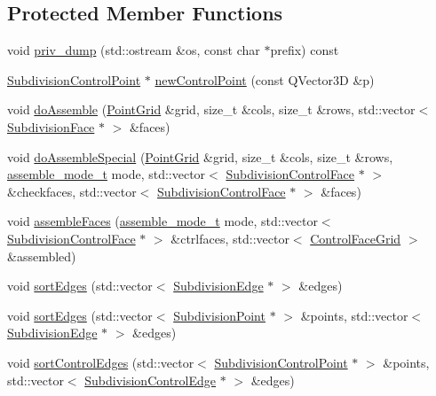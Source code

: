 \subsection*{Protected Member Functions}
\begin{DoxyCompactItemize}
\item 
void \hyperlink{classShipCAD_1_1SubdivisionSurface_a5c88eb988cc6a439242264bc54a6e3e1}{priv\+\_\+dump} (std\+::ostream \&os, const char $\ast$prefix) const 
\item 
\hyperlink{classShipCAD_1_1SubdivisionControlPoint}{Subdivision\+Control\+Point} $\ast$ \hyperlink{classShipCAD_1_1SubdivisionSurface_a251b711125d50aa51875451976e8a8d7}{new\+Control\+Point} (const Q\+Vector3D \&p)
\item 
void \hyperlink{classShipCAD_1_1SubdivisionSurface_a2e75286942677dde7ada4555a6842a43}{do\+Assemble} (\hyperlink{structShipCAD_1_1PointGrid}{Point\+Grid} \&grid, size\+\_\+t \&cols, size\+\_\+t \&rows, std\+::vector$<$ \hyperlink{classShipCAD_1_1SubdivisionFace}{Subdivision\+Face} $\ast$ $>$ \&faces)
\item 
void \hyperlink{classShipCAD_1_1SubdivisionSurface_ac609b5de32ea28568edb83439ae5261f}{do\+Assemble\+Special} (\hyperlink{structShipCAD_1_1PointGrid}{Point\+Grid} \&grid, size\+\_\+t \&cols, size\+\_\+t \&rows, \hyperlink{namespaceShipCAD_aaba70dc1c80dc540bef320cb9b720a20}{assemble\+\_\+mode\+\_\+t} mode, std\+::vector$<$ \hyperlink{classShipCAD_1_1SubdivisionControlFace}{Subdivision\+Control\+Face} $\ast$ $>$ \&checkfaces, std\+::vector$<$ \hyperlink{classShipCAD_1_1SubdivisionControlFace}{Subdivision\+Control\+Face} $\ast$ $>$ \&faces)
\item 
void \hyperlink{classShipCAD_1_1SubdivisionSurface_ab16b7b0697217616046ded3849af1f52}{assemble\+Faces} (\hyperlink{namespaceShipCAD_aaba70dc1c80dc540bef320cb9b720a20}{assemble\+\_\+mode\+\_\+t} mode, std\+::vector$<$ \hyperlink{classShipCAD_1_1SubdivisionControlFace}{Subdivision\+Control\+Face} $\ast$ $>$ \&ctrlfaces, std\+::vector$<$ \hyperlink{structShipCAD_1_1ControlFaceGrid}{Control\+Face\+Grid} $>$ \&assembled)
\item 
void \hyperlink{classShipCAD_1_1SubdivisionSurface_a2b270b878bb810d51bd7adf689db5366}{sort\+Edges} (std\+::vector$<$ \hyperlink{classShipCAD_1_1SubdivisionEdge}{Subdivision\+Edge} $\ast$ $>$ \&edges)
\item 
void \hyperlink{classShipCAD_1_1SubdivisionSurface_abb1b9223254ed3c713e860abfa4dde18}{sort\+Edges} (std\+::vector$<$ \hyperlink{classShipCAD_1_1SubdivisionPoint}{Subdivision\+Point} $\ast$ $>$ \&points, std\+::vector$<$ \hyperlink{classShipCAD_1_1SubdivisionEdge}{Subdivision\+Edge} $\ast$ $>$ \&edges)
\item 
void \hyperlink{classShipCAD_1_1SubdivisionSurface_a44fd2e4a8264e5d52ad2948fa32dfa97}{sort\+Control\+Edges} (std\+::vector$<$ \hyperlink{classShipCAD_1_1SubdivisionControlPoint}{Subdivision\+Control\+Point} $\ast$ $>$ \&points, std\+::vector$<$ \hyperlink{classShipCAD_1_1SubdivisionControlEdge}{Subdivision\+Control\+Edge} $\ast$ $>$ \&edges)
\end{DoxyCompactItemize}
